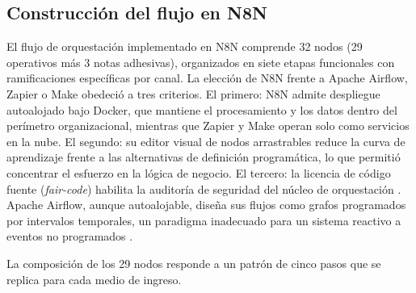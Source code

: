\subsection{Construcción del flujo en N8N}\label{subsec:construccion-flujo-n8n}

El flujo de orquestación implementado en N8N comprende 32 nodos (29 operativos más 3 notas adhesivas), organizados en siete etapas funcionales con ramificaciones específicas por canal. La elección de N8N frente a Apache Airflow, Zapier o Make obedeció a tres criterios. El primero: N8N admite despliegue autoalojado bajo Docker, que mantiene el procesamiento y los datos dentro del perímetro organizacional, mientras que Zapier y Make operan solo como servicios en la nube. El segundo: su editor visual de nodos arrastrables reduce la curva de aprendizaje frente a las alternativas de definición programática, lo que permitió concentrar el esfuerzo en la lógica de negocio. El tercero: la licencia de código fuente (\emph{fair-code}) habilita la auditoría de seguridad del núcleo de orquestación \parencite{n8n2024_docs}. Apache Airflow, aunque autoalojable, diseña sus flujos como grafos programados por intervalos temporales, un paradigma inadecuado para un sistema reactivo a eventos no programados \parencite{Apache2024_airflow}.

La composición de los 29 nodos responde a un patrón de cinco pasos que se replica para cada medio de ingreso.

